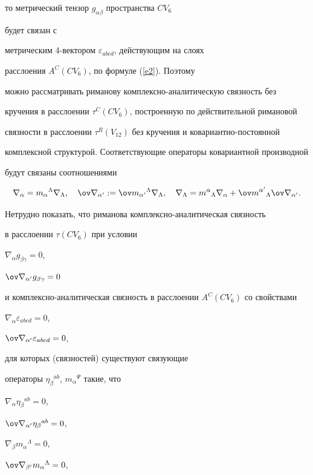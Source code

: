 то метрический тензор $g_{\alpha\beta}$ пространства $CV_6$


будет связан с


метрическим 4-вектором $\varepsilon_{abcd}$, действующим на слоях


расслоения $A^C(CV_6)$, по формуле (\ref{e2}). Поэтому


можно рассматривать риманову комплексно-аналитическую связность без 


кручения в расслоении $\tau^C(CV_6)$, построенную по действительной римановой


связности в расслоении $\tau^R(V_{12})$ без кручения и ковариантно-постоянной


комплексной структурой. Соответствующие операторы ковариантной производной


будут связаны соотношениями


$$


\nabla_\alpha=m_\alpha{}^\Lambda\nabla_\Lambda,\quad


\ov\nabla_{\alpha '}:=\ov m_{\alpha '}{}^\Lambda\nabla_\Lambda,\quad


\nabla_\Lambda=m^\alpha{}_\Lambda\nabla_\alpha+


\ov m^{\alpha '}{}_\Lambda\ov\nabla_{\alpha '}.


$$





Нетрудно показать, что риманова комплексно-аналитическая связность


в расслоении $\tau(CV_6)$ при условии


$\nabla_\alpha g_{\beta\gamma}=0$,


$\ov\nabla_{\alpha '} g_{\beta\gamma}=0$


и комплексно-аналитическая связность в расслоении $A^C(CV_6)$ со свойствами


$\nabla_\alpha\varepsilon_{abcd}=0$,


$\ov\nabla_{\alpha '}\varepsilon_{abcd}=0$,


для которых (связностей) существуют связующие


операторы $\eta_\beta{}^{ab}$, $m_\alpha{}^\Psi$ такие, что


$\nabla_\alpha \eta_\beta{}^{ab}=0$,


$\ov\nabla_{\alpha '} \eta_\beta{}^{ab}=0$,


$\nabla_\beta m_\alpha{}^\Lambda=0$,


$\ov\nabla_{\beta '} m_\alpha{}^\Lambda=0$,


